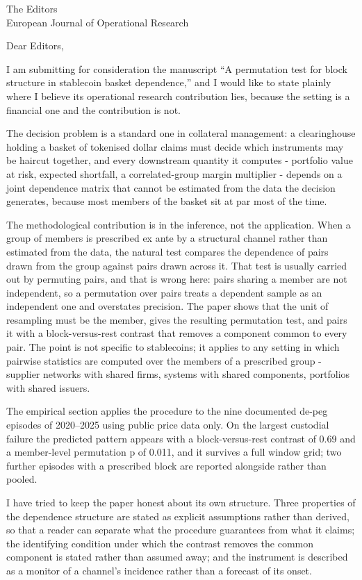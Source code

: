 \documentclass[11pt]{letter}
\begin{document}
\begin{letter}{The Editors\\European Journal of Operational Research}
\opening{Dear Editors,}

I am submitting for consideration the manuscript ``A permutation test for block structure in stablecoin basket dependence,'' and I would like to state plainly where I believe its operational research contribution lies, because the setting is a financial one and the contribution is not.

The decision problem is a standard one in collateral management: a clearinghouse holding a basket of tokenised dollar claims must decide which instruments may be haircut together, and every downstream quantity it computes - portfolio value at risk, expected shortfall, a correlated-group margin multiplier - depends on a joint dependence matrix that cannot be estimated from the data the decision generates, because most members of the basket sit at par most of the time.

The methodological contribution is in the inference, not the application. When a group of members is prescribed ex ante by a structural channel rather than estimated from the data, the natural test compares the dependence of pairs drawn from the group against pairs drawn across it. That test is usually carried out by permuting pairs, and that is wrong here: pairs sharing a member are not independent, so a permutation over pairs treats a dependent sample as an independent one and overstates precision. The paper shows that the unit of resampling must be the member, gives the resulting permutation test, and pairs it with a block-versus-rest contrast that removes a component common to every pair. The point is not specific to stablecoins; it applies to any setting in which pairwise statistics are computed over the members of a prescribed group - supplier networks with shared firms, systems with shared components, portfolios with shared issuers.

The empirical section applies the procedure to the nine documented de-peg episodes of 2020--2025 using public price data only. On the largest custodial failure the predicted pattern appears with a block-versus-rest contrast of 0.69 and a member-level permutation p of 0.011, and it survives a full window grid; two further episodes with a prescribed block are reported alongside rather than pooled.

I have tried to keep the paper honest about its own structure. Three properties of the dependence structure are stated as explicit assumptions rather than derived, so that a reader can separate what the procedure guarantees from what it claims; the identifying condition under which the contrast removes the common component is stated rather than assumed away; and the instrument is described as a monitor of a channel's incidence rather than a forecast of its onset.


\end{letter}
\end{document}
